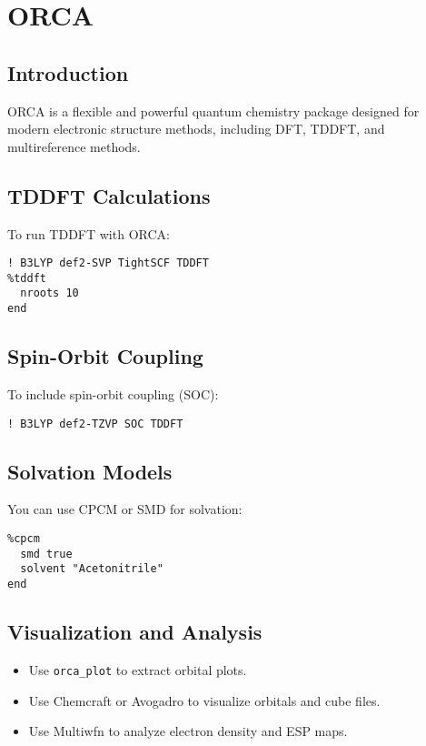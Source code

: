 \chapter{ORCA}

\section{Introduction}

ORCA is a flexible and powerful quantum chemistry package designed for modern electronic structure methods, including DFT, TDDFT, and multireference methods.

\section{TDDFT Calculations}

To run TDDFT with ORCA:

\begin{verbatim}
! B3LYP def2-SVP TightSCF TDDFT
%tddft
  nroots 10
end
\end{verbatim}

\section{Spin-Orbit Coupling}

To include spin-orbit coupling (SOC):

\begin{verbatim}
! B3LYP def2-TZVP SOC TDDFT
\end{verbatim}

\section{Solvation Models}

You can use CPCM or SMD for solvation:

\begin{verbatim}
%cpcm
  smd true
  solvent "Acetonitrile"
end
\end{verbatim}

\section{Visualization and Analysis}

\begin{itemize}
  \item Use \texttt{orca_plot} to extract orbital plots.
  \item Use Chemcraft or Avogadro to visualize orbitals and cube files.
  \item Use Multiwfn to analyze electron density and ESP maps.
\end{itemize}

